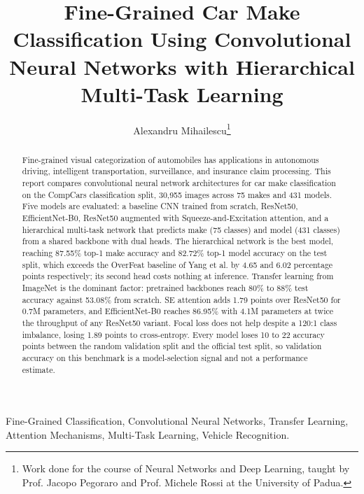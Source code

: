 \documentclass[10pt, conference, letterpaper]{IEEEtran}
\title{Fine-Grained Car Make Classification Using Convolutional Neural Networks with Hierarchical Multi-Task Learning}
\author{Alexandru Mihailescu\thanks{Work done for the course of Neural Networks and Deep Learning, taught by Prof. Jacopo Pegoraro and Prof. Michele Rossi at the University of Padua.}}
\begin{document}
\maketitle

\begin{abstract}
Fine-grained visual categorization of automobiles has applications in autonomous driving, intelligent transportation, surveillance, and insurance claim processing. This report compares convolutional neural network architectures for car make classification on the CompCars classification split, 30,955 images across 75 makes and 431 models. Five models are evaluated: a baseline CNN trained from scratch, ResNet50, EfficientNet-B0, ResNet50 augmented with Squeeze-and-Excitation attention, and a hierarchical multi-task network that predicts make (75 classes) and model (431 classes) from a shared backbone with dual heads. The hierarchical network is the best model, reaching 87.55\% top-1 make accuracy and 82.72\% top-1 model accuracy on the test split, which exceeds the OverFeat baseline of Yang et al. by 4.65 and 6.02 percentage points respectively; its second head costs nothing at inference. Transfer learning from ImageNet is the dominant factor: pretrained backbones reach 80\% to 88\% test accuracy against 53.08\% from scratch. SE attention adds 1.79 points over ResNet50 for 0.7M parameters, and EfficientNet-B0 reaches 86.95\% with 4.1M parameters at twice the throughput of any ResNet50 variant. Focal loss does not help despite a 120:1 class imbalance, losing 1.89 points to cross-entropy. Every model loses 10 to 22 accuracy points between the random validation split and the official test split, so validation accuracy on this benchmark is a model-selection signal and not a performance estimate.
\end{abstract}

\IEEEkeywords
Fine-Grained Classification, Convolutional Neural Networks, Transfer Learning, Attention Mechanisms, Multi-Task Learning, Vehicle Recognition.
\endIEEEkeywords













\end{document}
